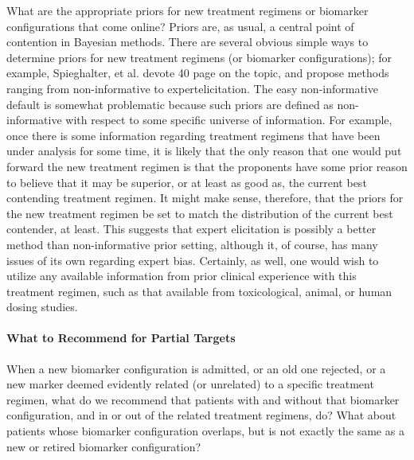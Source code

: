 \documentclass[12pt]{article}
\begin{document}
What are the appropriate priors for new treatment regimens or
biomarker configurations that come online?  Priors are, as usual, a
central point of contention in Bayesian methods. There are several
obvious simple ways to determine priors for new treatment regimens (or
biomarker configurations); for example, Spieghalter, et al.  devote 40
page on the topic, and propose methods ranging from non-informative to
expertelicitation. The easy non-informative default is somewhat
problematic because such priors are defined as non-informative with
respect to some specific universe of information. For example, once
there is some information regarding treatment regimens that have been
under analysis for some time, it is likely that the only reason that
one would put forward the new treatment regimen is that the proponents
have some prior reason to believe that it may be superior, or at least
as good as, the current best contending treatment regimen. It might
make sense, therefore, that the priors for the new treatment regimen
be set to match the distribution of the current best contender, at
least. This suggests that expert elicitation is possibly a better
method than non-informative prior setting, although it, of course, has
many issues of its own regarding expert bias. Certainly, as well, one
would wish to utilize any available information from prior clinical
experience with this treatment regimen, such as that available from
toxicological, animal, or human dosing studies.

\paragraph*{What to Recommend for Partial Targets}

When a new biomarker configuration is admitted, or an old one
rejected, or a new marker deemed evidently related (or unrelated) to a
specific treatment regimen, what do we recommend that patients with
and without that biomarker configuration, and in or out of the related
treatment regimens, do? What about patients whose biomarker
configuration overlaps, but is not exactly the same as a new or
retired biomarker configuration?
\end{document}

